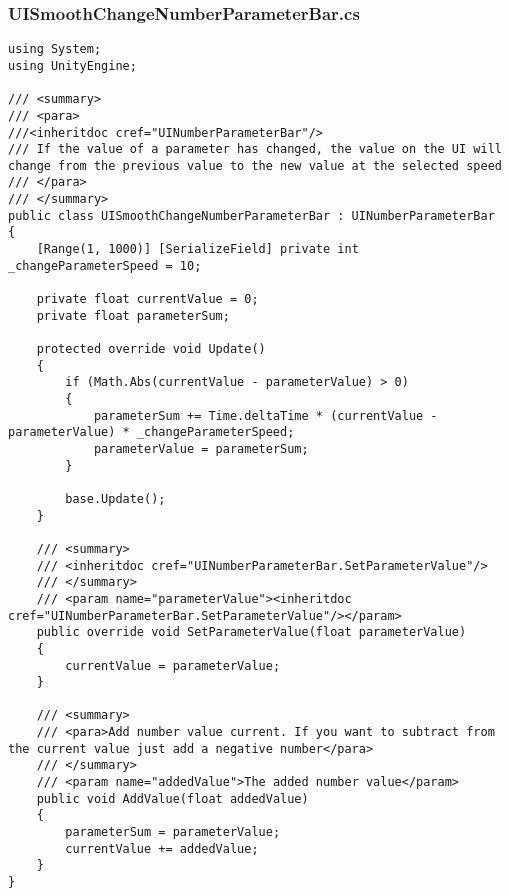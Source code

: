 \subsubsection*{UISmoothChangeNumberParameterBar.cs}
\begin{verbatim}
using System;
using UnityEngine;

/// <summary>
/// <para>
///<inheritdoc cref="UINumberParameterBar"/>
/// If the value of a parameter has changed, the value on the UI will change from the previous value to the new value at the selected speed
/// </para>
/// </summary>
public class UISmoothChangeNumberParameterBar : UINumberParameterBar
{
    [Range(1, 1000)] [SerializeField] private int _changeParameterSpeed = 10;

    private float currentValue = 0;
    private float parameterSum;

    protected override void Update()
    {
        if (Math.Abs(currentValue - parameterValue) > 0)
        {
            parameterSum += Time.deltaTime * (currentValue - parameterValue) * _changeParameterSpeed;
            parameterValue = parameterSum;
        }

        base.Update();
    }

    /// <summary>
    /// <inheritdoc cref="UINumberParameterBar.SetParameterValue"/>
    /// </summary>
    /// <param name="parameterValue"><inheritdoc cref="UINumberParameterBar.SetParameterValue"/></param>
    public override void SetParameterValue(float parameterValue)
    {
        currentValue = parameterValue;
    }

    /// <summary>
    /// <para>Add number value current. If you want to subtract from the current value just add a negative number</para>
    /// </summary>
    /// <param name="addedValue">The added number value</param>
    public void AddValue(float addedValue)
    {
        parameterSum = parameterValue;
        currentValue += addedValue;
    }
}
\end{verbatim}

